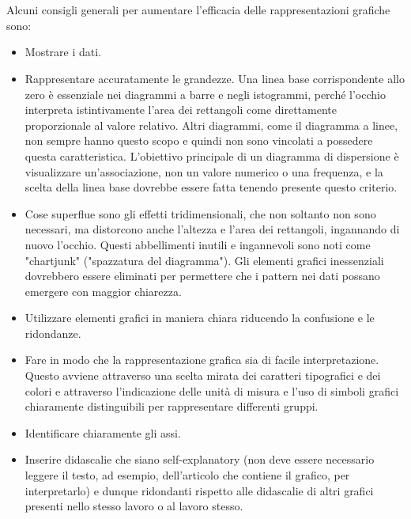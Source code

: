 \documentclass[10pt, draft]{book}
\begin{document}
\\
\\
Alcuni consigli generali per aumentare l'efficacia delle rappresentazioni grafiche sono:
\begin{itemize}
    \item Mostrare i dati.
    \item Rappresentare accuratamente le grandezze. Una linea base corrispondente allo zero è essenziale nei diagrammi a barre e negli istogrammi, perché l'occhio interpreta istintivamente l'area dei rettangoli come direttamente proporzionale al valore relativo. Altri diagrammi, come il diagramma a linee, non sempre hanno questo scopo e quindi non sono vincolati a possedere questa caratteristica. L'obiettivo principale di un diagramma di dispersione è visualizzare un'associazione, non un valore numerico o una frequenza, e la scelta della linea base dovrebbe essere fatta tenendo presente questo criterio.
    \item Cose superflue sono gli effetti tridimensionali, che non soltanto non sono necessari, ma distorcono anche l'altezza e l'area dei rettangoli, ingannando di nuovo l'occhio. Questi abbellimenti inutili e ingannevoli sono noti come "chartjunk" ("spazzatura del diagramma"). Gli elementi grafici inessenziali dovrebbero essere eliminati per permettere che i pattern nei dati possano emergere con maggior chiarezza.
    \item Utilizzare elementi grafici in maniera chiara riducendo la confusione e le ridondanze.
    \item Fare in modo che la rappresentazione grafica sia di facile interpretazione. Questo avviene attraverso una scelta mirata dei caratteri tipografici e dei colori e attraverso l'indicazione delle unità di misura e l'uso di simboli grafici chiaramente distinguibili per rappresentare differenti gruppi.
    \item Identificare chiaramente gli assi.
    \item Inserire didascalie che siano self-explanatory (non deve essere necessario leggere il testo, ad esempio, dell’articolo che contiene il grafico, per interpretarlo) e dunque ridondanti rispetto alle didascalie di altri grafici presenti nello stesso lavoro o al lavoro stesso.
\end{itemize}
\end{document}

